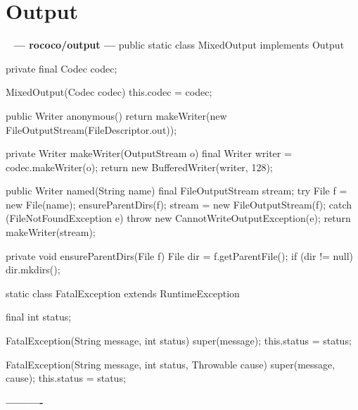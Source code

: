\documentclass{book}
\newenvironment{chunk}[1]{%
{\ }\newline\noindent%
\hbox{\hskip 2.0cm}{\bf --- #1 ---}%
\verbatim}%                               say exactly what we see
{\endverbatim%
\par{}%
\noindent{}%
\hbox{\hskip 2.0cm}{\bf ----------}%
\par%
\normalsize\noindent}%
\begin{document}
\section{Output}
\begin{chunk}{rococo/output}
public static class MixedOutput implements Output {
    private final Codec codec;

    MixedOutput(Codec codec) {
        this.codec = codec;
    }

    public Writer anonymous() {
        return makeWriter(new FileOutputStream(FileDescriptor.out));
    }

    private Writer makeWriter(OutputStream o) {
        final Writer writer = codec.makeWriter(o);
        return new BufferedWriter(writer, 128);
    }

    public Writer named(String name) {
        final FileOutputStream stream;
        try {
            File f = new File(name);
            ensureParentDirs(f);
            stream = new FileOutputStream(f);
        } catch (FileNotFoundException e) {
            throw new CannotWriteOutputException(e);
        }
        return makeWriter(stream);
    }

    private void ensureParentDirs(File f) {
        File dir = f.getParentFile();
        if (dir != null) {
            dir.mkdirs();
        }
    }
}

static class FatalException extends RuntimeException {
    final int status;

    FatalException(String message, int status) {
        super(message);
        this.status = status;
    }

    FatalException(String message, int status, Throwable cause) {
        super(message, cause);
        this.status = status;
    }
}
\end{chunk}
\end{document}
